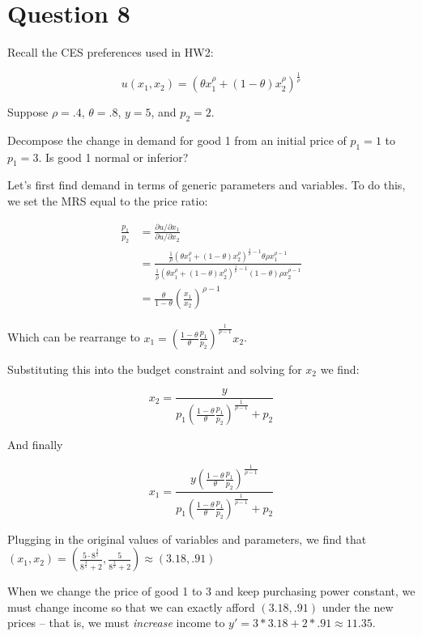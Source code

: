 \documentclass{article}
\newenvironment{solution}{\color{red}}{\color{black}}
\begin{document}
\section*{Question 8}
Recall the CES preferences used in HW2:

\[
u(x_1, x_2) = \left(\theta x_1^{\rho} + (1-\theta) x_2^{\rho}\right)^{\frac1{\rho}}
\]

Suppose $\rho = .4$, $\theta = .8$, $y = 5$, and $p_2 = 2$.

Decompose the change in demand for good 1 from an initial price of $p_1 = 1$ to $p_1 = 3$. Is good 1 normal or inferior?

\begin{solution}
Let's first find demand in terms of generic parameters and variables. To do this, we set the MRS equal to the price ratio:

\begin{align*}
\frac{p_1}{p_2} &= \frac{\partial u / \partial x_1}{\partial u /\partial x_2} \\
 &= \frac{\frac1\rho \left( \theta x_1^\rho + \left(1-\theta\right) x_2^\rho \right)^{\frac1\rho - 1} \theta \rho x_1^{\rho - 1}}{\frac1\rho \left( \theta x_1^\rho + \left(1-\theta\right) x_2^\rho \right)^{\frac1\rho - 1} \left(1-\theta\right) \rho x_2^{\rho - 1}} \\
 &= \frac{\theta}{1-\theta} \left( \frac{x_1}{x_2} \right)^{\rho - 1}
\end{align*}

Which can be rearrange to $x_1 = \left( \frac{1-\theta}{\theta} \frac{p_1}{p_2} \right)^\frac1{\rho - 1} x_2$.

Substituting this into the budget constraint and solving for $x_2$ we find:

\[ x_2 = \frac{y}{p_1 \left( \frac{1-\theta}{\theta} \frac{p_1}{p_2} \right)^\frac1{\rho - 1} + p_2} \]

And finally

\[ x_1 = \frac{y \left( \frac{1-\theta}{\theta} \frac{p_1}{p_2} \right)^\frac1{\rho - 1}}{p_1 \left( \frac{1-\theta}{\theta} \frac{p_1}{p_2} \right)^\frac1{\rho - 1} + p_2} \]

Plugging in the original values of variables and parameters, we find that $(x_1, x_2) = \left( \frac{5\cdot 8^{\frac35}}{8^{\frac35} + 2}, \frac{5}{8^{\frac35} + 2} \right) \approx (3.18, .91)$

When we change the price of good 1 to 3 and keep purchasing power constant, we must change income so that we can exactly afford $(3.18, .91)$ under the new prices -- that is, we must \textit{increase} income to $y' = 3*3.18 + 2*.91 \approx 11.35$.


\end{solution}
\end{document}
